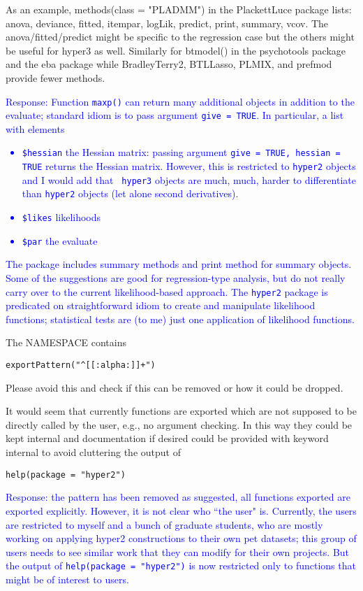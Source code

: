 \documentclass[12pt]{article}
\begin{document}
As an example, methods(class = "PLADMM") in the PlackettLuce package
lists: anova, deviance, fitted, itempar, logLik, predict, print,
summary, vcov. The anova/fitted/predict might be specific to the
regression case but the others might be useful for hyper3 as
well. Similarly for btmodel() in the psychotools package and the eba
package while BradleyTerry2, BTLLasso, PLMIX, and prefmod provide
fewer methods.

\textcolor{blue}{Response: Function {\tt maxp()} can return many
  additional objects in addition to the evaluate; standard idiom is to
  pass argument {\tt give = TRUE}.  In particular, a list with
  elements
  \begin{itemize}
  \item {\tt \$hessian} the Hessian matrix: passing argument {\tt give
    = TRUE, hessian = TRUE} returns the Hessian matrix.  However, this
    is restricted to {\tt hyper2} objects and I would add that {\tt
      hyper3} objects are much, much, harder to differentiate than
    {\tt hyper2} objects (let alone second derivatives).
    \item {\tt \$likes} likelihoods
    \item {\tt \$par} the evaluate
  \end{itemize}
  The package includes summary methods and print method for summary
  objects.\\ Some of the suggestions are good for regression-type
  analysis, but do not really carry over to the current
  likelihood-based approach.  The {\tt hyper2} package is predicated
  on straightforward idiom to create and manipulate likelihood
  functions; statistical tests are (to me) just one application of
  likelihood functions.}

The NAMESPACE contains

\verb=exportPattern("^[[:alpha:]]+")=

Please avoid this and check if this can be removed or how it could be
dropped.

It would seem that currently functions are exported which are not
supposed to be directly called by the user, e.g., no argument
checking. In this way they could be kept internal and documentation if
desired could be provided with keyword internal to avoid cluttering
the output of

\verb+help(package = "hyper2")+

\textcolor{blue}{Response: the pattern has been removed as suggested,
  all functions exported are exported explicitly.  However, it is not
  clear who ``the user" is.  Currently, the users are restricted to
  myself and a bunch of graduate students, who are mostly working on
  applying hyper2 constructions to their own pet datasets; this group
  of users needs to see similar work that they can modify for their
  own projects.  But the output of \verb+help(package = "hyper2")+ is
  now restricted only to functions that might be of interest to users.
  }
\end{document}
